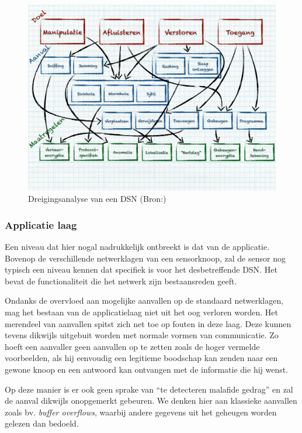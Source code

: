 \begin{figure}[ht]
  \centering
  \includegraphics[width=0.95\linewidth]{resources/wsn-threat-analysis.pdf}
  \caption[Dreigingsanalyse van een DSN]{Dreigingsanalyse van een DSN (Bron:\citep{aschenbruck2012security})}
  \label{fig:wsn-threat-analysis}
\end{figure}

\vspace{-5mm}

\subsubsection*{Applicatie laag}

Een niveau dat hier nogal nadrukkelijk ontbreekt is dat van de applicatie.
Bovenop de verschillende netwerklagen van een sensorknoop, zal de sensor nog
typisch een niveau kennen dat specifiek is voor het desbetreffende DSN. Het
bevat de functionaliteit die het netwerk zijn bestaansreden geeft.

Ondanks de overvloed aan mogelijke aanvallen op de standaard netwerklagen, mag
het bestaan van de applicatielaag niet uit het oog verloren worden. Het
merendeel van aanvallen spitst zich net toe op fouten in deze laag. Deze kunnen
tevens dikwijls uitgebuit worden met normale vormen van communicatie. Zo hoeft
een aanvaller geen aanvallen op te zetten zoals de hoger vermelde voorbeelden,
als hij eenvoudig een legitieme boodschap kan zenden naar een gewone knoop en
een antwoord kan ontvangen met de informatie die hij wenst.

Op deze manier is er ook geen sprake van ``te detecteren malafide gedrag'' en
zal de aanval dikwijls onopgemerkt gebeuren. We denken hier aan klassieke
aanvallen zoals bv. \emph{buffer overflows}, waarbij andere gegevens uit het
geheugen worden gelezen dan bedoeld.

